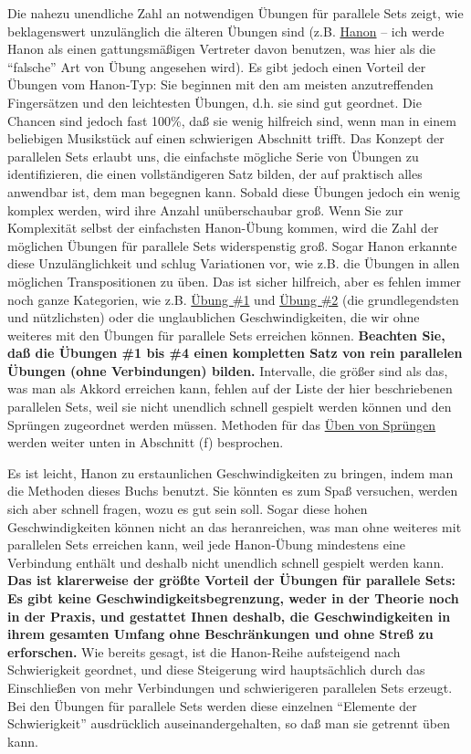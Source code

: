 Die nahezu unendliche Zahl an notwendigen Übungen für parallele Sets zeigt, wie beklagenswert unzulänglich die älteren Übungen sind (z.B. \hyperref[c1iii7h]{Hanon} -- ich werde Hanon als einen gattungsmäßigen Vertreter davon benutzen, was hier als die \enquote{falsche} Art von Übung angesehen wird).
Es gibt jedoch einen Vorteil der Übungen vom Hanon-Typ: Sie beginnen mit den am meisten anzutreffenden Fingersätzen und den leichtesten Übungen, d.h. sie sind gut geordnet.
Die Chancen sind jedoch fast 100\%, daß sie wenig hilfreich sind, wenn man in einem beliebigen Musikstück auf einen schwierigen Abschnitt trifft.
Das Konzept der parallelen Sets erlaubt uns, die einfachste mögliche Serie von Übungen zu identifizieren, die einen vollständigeren Satz bilden, der auf praktisch alles anwendbar ist, dem man begegnen kann.
Sobald diese Übungen jedoch ein wenig komplex werden, wird ihre Anzahl unüberschaubar groß.
Wenn Sie zur Komplexität selbst der einfachsten Hanon-Übung kommen, wird die Zahl der möglichen Übungen für parallele Sets widerspenstig groß.
Sogar Hanon erkannte diese Unzulänglichkeit und schlug Variationen vor, wie z.B. die Übungen in allen möglichen Transpositionen zu üben.
Das ist sicher hilfreich, aber es fehlen immer noch ganze Kategorien, wie z.B. \hyperref[c1iii7b1]{Übung \#1} und \hyperref[c1iii7b2]{Übung \#2} (die grundlegendsten und nützlichsten) oder die unglaublichen Geschwindigkeiten, die wir ohne weiteres mit den Übungen für parallele Sets erreichen können.
\textbf{Beachten Sie, daß die Übungen \#1 bis \#4 einen kompletten Satz von rein parallelen Übungen (ohne Verbindungen) bilden.}
Intervalle, die größer sind als das, was man als Akkord erreichen kann, fehlen auf der Liste der hier beschriebenen parallelen Sets, weil sie nicht unendlich schnell gespielt werden können und den Sprüngen zugeordnet werden müssen.
Methoden für das \hyperref[c1iii7f]{Üben von Sprüngen} werden weiter unten in Abschnitt (f) besprochen.

Es ist leicht, Hanon zu erstaunlichen Geschwindigkeiten zu bringen, indem man die Methoden dieses Buchs benutzt.
Sie könnten es zum Spaß versuchen, werden sich aber schnell fragen, wozu es gut sein soll.
Sogar diese hohen Geschwindigkeiten können nicht an das heranreichen, was man ohne weiteres mit parallelen Sets erreichen kann, weil jede Hanon-Übung mindestens eine Verbindung enthält und deshalb nicht unendlich schnell gespielt werden kann.
\textbf{Das ist klarerweise der größte Vorteil der Übungen für parallele Sets: Es gibt keine Geschwindigkeitsbegrenzung, weder in der Theorie noch in der Praxis, und gestattet Ihnen deshalb, die Geschwindigkeiten in ihrem gesamten Umfang ohne Beschränkungen und ohne Streß zu erforschen.}
Wie bereits gesagt, ist die Hanon-Reihe aufsteigend nach Schwierigkeit geordnet, und diese Steigerung wird hauptsächlich durch das Einschließen von mehr Verbindungen und schwierigeren parallelen Sets erzeugt.
Bei den Übungen für parallele Sets werden diese einzelnen \enquote{Elemente der Schwierigkeit} ausdrücklich auseinandergehalten, so daß man sie getrennt üben kann.

